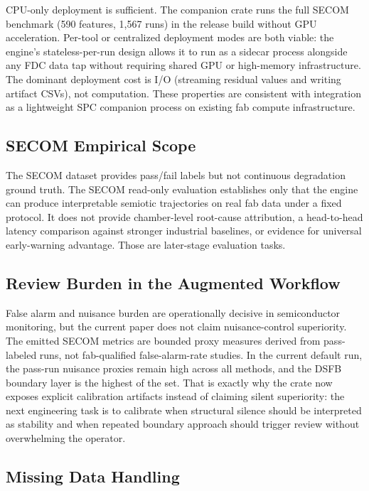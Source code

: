 \documentclass[11pt,letterpaper]{article}
\theoremstyle{scresult}
\begin{document}
CPU-only deployment is sufficient. The companion crate runs the full SECOM
benchmark (590 features, 1{,}567 runs) in the release build without GPU
acceleration. Per-tool or centralized deployment modes are both
viable: the engine's stateless-per-run design allows it to run as a sidecar
process alongside any FDC data tap without requiring shared GPU or
high-memory infrastructure. The dominant deployment cost is I/O (streaming
residual values and writing artifact CSVs), not computation. These properties
are consistent with integration as a lightweight SPC companion process on
existing fab compute infrastructure.

\subsection{SECOM Empirical Scope}

The SECOM dataset provides pass/fail labels but not continuous degradation
ground truth. The SECOM read-only evaluation establishes only that the engine can
produce interpretable semiotic trajectories on real fab data under a fixed
protocol. It does not provide chamber-level root-cause attribution, a
head-to-head latency comparison against stronger industrial baselines, or
evidence for universal early-warning advantage. Those are later-stage
evaluation tasks.

\subsection{Review Burden in the Augmented Workflow}

False alarm and nuisance burden are operationally decisive in semiconductor
monitoring, but the current paper does not claim nuisance-control superiority.
The emitted SECOM metrics are bounded proxy measures derived from pass-labeled
runs, not fab-qualified false-alarm-rate studies. In the current default run,
the pass-run nuisance proxies remain high across all methods, and the DSFB
boundary layer is the highest of the set. That is exactly why the crate now
exposes explicit calibration artifacts instead of claiming silent superiority:
the next engineering task is to calibrate when structural silence should be
interpreted as stability and when repeated boundary approach should trigger
review without overwhelming the operator.

\subsection{Missing Data Handling}
\end{document}
